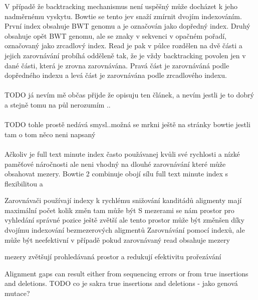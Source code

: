 \documentclass[czech,DP]{thesiskiv}
\numberwithin{equation}{section}
\begin{document}
V případě že backtracking mechanismus není uspěšný může docházet k jeho nadměrnému vyskytu. Bowtie se tento jev snaží zmírnit dvojím indexováním. První index obsahuje BWT genomu a je označován jako dopředný index. Druhý obsahuje opět BWT genomu, ale se znaky v sekvenci v opačném pořadí, označovaný jako zrcadlový index. Read je pak v půlce rozdělen na dvě části a jejich zarovnávání probíhá odděleně tak, že je vždy backtracking povolen jen v dané části, která je zrovna zarovnávána. Pravá část je zarovnáváná podle dopředného indexu a levá část je zarovnávána podle zrcadlového indexu. 
\\
\\
TODO já nevím mě občas přijde že opisuju ten článek, a nevím jestli je to dobrý a stejně tomu na půl nerozumím .. 
\\
\\
TODO tohle prostě nedává smysl..možná se mrkni ještě na stránky bowtie jestli tam o tom něco neni napsaný
\\
\\
Ačkoliv je full text minute index často použávanej kvůli své rychlosti a nízké paměťové náročnosti ale neni vhodný na dlouhé zarovnávání které může obsahovat mezery. Bowtie 2 combinuje obojí sílu full text minute index s flexibilitou a 

Zarovnávači používají indexy k rychlému snižování kanditádů 
aligmenty mají maximální počet kolik změn tam může být 
S mezerami se nám prostor pro vyhledání správné pozice ještě zvětší
ale tento prostor může být změnšen díky dvojímu indexování bezmezerových aligmentů
Zarovnávání pomocí indexů, ale může být neefektivní v případě pokud zarovnávaný read obsahuje mezery
 
 mezery zvětšují prohledávaná prostor a redukují efektivitu prořezávání
 
  

Alignment gaps can result either from sequencing errors or from true insertions and deletions. 
TODO co je sakra true insertions and deletions - jako genová mutace? 
\end{document}
